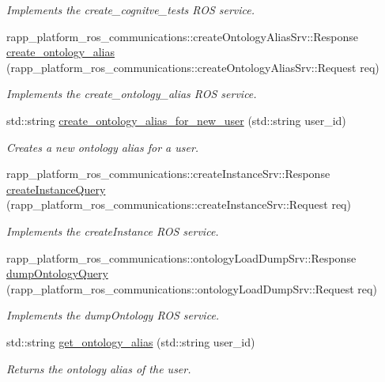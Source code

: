 \begin{DoxyCompactItemize}
\begin{DoxyCompactList}\small\item\em Implements the create\-\_\-cognitve\-\_\-tests R\-O\-S service. \end{DoxyCompactList}\item 
rapp\-\_\-platform\-\_\-ros\-\_\-communications\-::create\-Ontology\-Alias\-Srv\-::\-Response \hyperlink{classKnowrobWrapper_a6b5c92e16d3592a63d6509dbca1317fe}{create\-\_\-ontology\-\_\-alias} (rapp\-\_\-platform\-\_\-ros\-\_\-communications\-::create\-Ontology\-Alias\-Srv\-::\-Request req)
\begin{DoxyCompactList}\small\item\em Implements the create\-\_\-ontology\-\_\-alias R\-O\-S service. \end{DoxyCompactList}\item 
std\-::string \hyperlink{classKnowrobWrapper_a85be3123e645ca77004c7461e097a15e}{create\-\_\-ontology\-\_\-alias\-\_\-for\-\_\-new\-\_\-user} (std\-::string user\-\_\-id)
\begin{DoxyCompactList}\small\item\em Creates a new ontology alias for a user. \end{DoxyCompactList}\item 
rapp\-\_\-platform\-\_\-ros\-\_\-communications\-::create\-Instance\-Srv\-::\-Response \hyperlink{classKnowrobWrapper_a798a52556983073055944fd1c51495de}{create\-Instance\-Query} (rapp\-\_\-platform\-\_\-ros\-\_\-communications\-::create\-Instance\-Srv\-::\-Request req)
\begin{DoxyCompactList}\small\item\em Implements the create\-Instance R\-O\-S service. \end{DoxyCompactList}\item 
rapp\-\_\-platform\-\_\-ros\-\_\-communications\-::ontology\-Load\-Dump\-Srv\-::\-Response \hyperlink{classKnowrobWrapper_a86796d95e57f4620474dab7e1f2df128}{dump\-Ontology\-Query} (rapp\-\_\-platform\-\_\-ros\-\_\-communications\-::ontology\-Load\-Dump\-Srv\-::\-Request req)
\begin{DoxyCompactList}\small\item\em Implements the dump\-Ontology R\-O\-S service. \end{DoxyCompactList}\item 
std\-::string \hyperlink{classKnowrobWrapper_af50b1b512559d86a74c6de69a34ac3cc}{get\-\_\-ontology\-\_\-alias} (std\-::string user\-\_\-id)
\begin{DoxyCompactList}\small\item\em Returns the ontology alias of the user. \end{DoxyCompactList}\item 

\end{DoxyCompactItemize}
